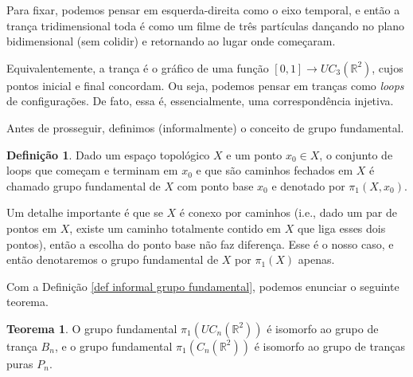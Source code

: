 \documentclass[a4paper,portuguese,11pt,twoside, leqno]{book}
\theoremstyle{definition}
\newtheorem{theorem}{Teorema}[section]
\newtheorem{deff}{Definição}[section]
\begin{document}
	\par\vspace{0.3cm} Para fixar, podemos pensar em esquerda-direita como o eixo temporal, e então a trança tridimensional toda é como um filme de três partículas dançando no plano bidimensional (sem colidir) e retornando ao lugar onde começaram.
	\par\vspace{0.3cm} Equivalentemente, a trança é o gráfico de uma função $[0,1]\to UC_3(\mathbb{R}^2)$, cujos pontos inicial e final concordam. Ou seja, podemos pensar em tranças como \textit{loops} de configurações. De fato, essa é, essencialmente, uma correspondência injetiva.
	\par\vspace{0.3cm} Antes de prosseguir, definimos (informalmente) o conceito de grupo fundamental.
	
	\begin{deff}
		\label{def informal grupo fundamental}
		Dado um espaço topológico $X$ e um ponto $x_0\in X$, o conjunto de loops que começam e terminam em $x_0$ e que são caminhos fechados em $X$ é chamado grupo fundamental de $X$ com ponto base $x_0$ e denotado por $\pi_1(X,x_0)$.
	\end{deff}
	
	\par\vspace{0.3cm} Um detalhe importante é que se $X$ é conexo por caminhos (i.e., dado um par de pontos em $X$, existe um caminho totalmente contido em $X$ que liga esses dois pontos), então a escolha do ponto base não faz diferença. Esse é o nosso caso, e então denotaremos o grupo fundamental de $X$ por $\pi_1(X)$ apenas.
	\par\vspace{0.3cm} Com a Definição \eqref{def informal grupo fundamental}, podemos enunciar o seguinte teorema.
	
	\begin{theorem}
		\label{grupo fundamental de tranca}
		O grupo fundamental $\pi_1(UC_n(\mathbb{R}^2))$ é isomorfo ao grupo de trança $B_n$, e o grupo fundamental $\pi_1(C_n(\mathbb{R}^2))$ é isomorfo ao grupo de tranças puras $P_n$.
	\end{theorem} 
	
\end{document}
